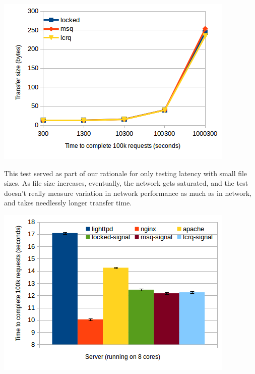 \documentclass[twoside,10pt]{article}
\newenvironment{Figure}
  {\par\medskip\noindent\minipage{\linewidth}}
  {\endminipage\par\medskip}
\begin{document}
\begin{multicols}{2}
\begin{Figure}
\includegraphics[width=\linewidth]{img/latencyfilesize.png}
\end{Figure}
This test served as part of our rationale for only testing latency with small 
file sizes. As file size increases, eventually, the network gets saturated, and the test doesn't really measure variation in network performance as much as in network, and takes needlessly longer transfer time.  
\begin{Figure}
\includegraphics[width=\linewidth]{img/commodityserverlatencies.png}
\end{Figure}


\end{multicols}
\end{document}
